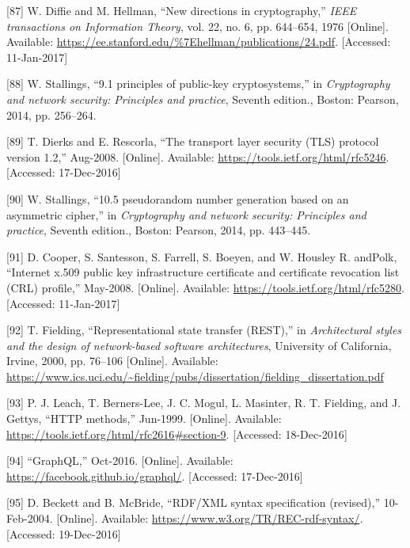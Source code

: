 \documentclass[12pt,english,a4paper,titlepage,cleardoublepage=empty,dottedtoc]{report}
\begin{document}
\hypertarget{ref-paper_1976_d-h-key-exchange}{}
{[}87{]} W. Diffie and M. Hellman, ``New directions in cryptography,''
\emph{IEEE transactions on Information Theory}, vol. 22, no. 6, pp.
644--654, 1976 {[}Online{]}. Available:
\url{https://ee.stanford.edu/\%7Ehellman/publications/24.pdf}.
{[}Accessed: 11-Jan-2017{]}

\hypertarget{ref-book_2014_chapter-9-1-public-key-crypto}{}
{[}88{]} W. Stallings, ``9.1 principles of public-key cryptosystems,''
in \emph{Cryptography and network security: Principles and practice},
Seventh edition., Boston: Pearson, 2014, pp. 256--264.

\hypertarget{ref-web_spec_tls}{}
{[}89{]} T. Dierks and E. Rescorla, ``The transport layer security (TLS)
protocol version 1.2,'' Aug-2008. {[}Online{]}. Available:
\url{https://tools.ietf.org/html/rfc5246}. {[}Accessed: 17-Dec-2016{]}

\hypertarget{ref-book_2014_chapter-14-5-pki}{}
{[}90{]} W. Stallings, ``10.5 pseudorandom number generation based on an
asymmetric cipher,'' in \emph{Cryptography and network security:
Principles and practice}, Seventh edition., Boston: Pearson, 2014, pp.
443--445.

\hypertarget{ref-web_spec_x509}{}
{[}91{]} D. Cooper, S. Santesson, S. Farrell, S. Boeyen, and W. Housley
R. andPolk, ``Internet x.509 public key infrastructure certificate and
certificate revocation list (CRL) profile,'' May-2008. {[}Online{]}.
Available: \url{https://tools.ietf.org/html/rfc5280}. {[}Accessed:
11-Jan-2017{]}

\hypertarget{ref-web_spec_rest}{}
{[}92{]} T. Fielding, ``Representational state transfer (REST),'' in
\emph{Architectural styles and the design of network-based software
architectures}, University of California, Irvine, 2000, pp. 76--106
{[}Online{]}. Available:
\url{https://www.ics.uci.edu/~fielding/pubs/dissertation/fielding_dissertation.pdf}

\hypertarget{ref-web_spec_http-methods}{}
{[}93{]} P. J. Leach, T. Berners-Lee, J. C. Mogul, L. Masinter, R. T.
Fielding, and J. Gettys, ``HTTP methods,'' Jun-1999. {[}Online{]}.
Available: \url{https://tools.ietf.org/html/rfc2616\#section-9}.
{[}Accessed: 18-Dec-2016{]}

\hypertarget{ref-web_spec_graphql}{}
{[}94{]} ``GraphQL,'' Oct-2016. {[}Online{]}. Available:
\url{https://facebook.github.io/graphql/}. {[}Accessed: 17-Dec-2016{]}

\hypertarget{ref-web_w3c-tr_rdf}{}
{[}95{]} D. Beckett and B. McBride, ``RDF/XML syntax specification
(revised),'' 10-Feb-2004. {[}Online{]}. Available:
\url{https://www.w3.org/TR/REC-rdf-syntax/}. {[}Accessed: 19-Dec-2016{]}
\end{document}

